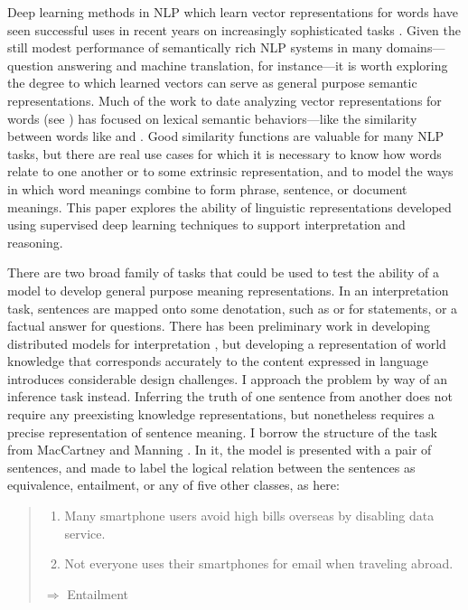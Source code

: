Deep learning methods in NLP which learn vector representations for words have seen successful uses in recent years on increasingly sophisticated tasks \cite{collobert2011natural, socher2011semi, socher2013acl1, chen2013learning}. Given the still modest performance of semantically rich NLP systems in many domains---question answering and machine translation, for instance---it is worth exploring the degree to which learned vectors can serve as general purpose semantic representations. 
Much of the work to date analyzing vector representations for words (see \cite{baroni2013frege}) has focused on lexical semantic behaviors---like the similarity between words like  and . Good similarity functions are valuable for many NLP tasks, but there are real use cases for which it is necessary to know how words relate to one another or to some extrinsic representation, and to model the ways in which word meanings combine to form phrase, sentence, or document meanings. This paper explores the ability of linguistic representations developed using supervised deep learning techniques to support interpretation and reasoning. 


There are two broad family of tasks that could be used to test the ability of a model to develop general purpose meaning representations. In an interpretation task, sentences are mapped onto some denotation, such as   or  for statements, or a factual answer for questions. There has been preliminary work in developing distributed models for interpretation \cite{grefenstette2013towards, rocktaschellow}, but developing a representation of world knowledge that corresponds accurately to the content expressed in language introduces considerable design challenges. I approach the problem by way of an inference task instead. Inferring the truth of one sentence from another does not require any preexisting knowledge representations, but nonetheless requires a precise representation of sentence meaning. I borrow the structure of the task from MacCartney and Manning  \cite{maccartney2009extended}. In it, the model is presented with a pair of sentences, and made to label the logical relation between the sentences as equivalence, entailment, or any of five other classes, as here:

\begin{quote}
\begin{enumerate}\small
\item Many smartphone users avoid high bills overseas by disabling data service.
\item Not everyone uses their smartphones for email when traveling abroad.
\end{enumerate} 
$\Rightarrow$ Entailment
\end{quote}

